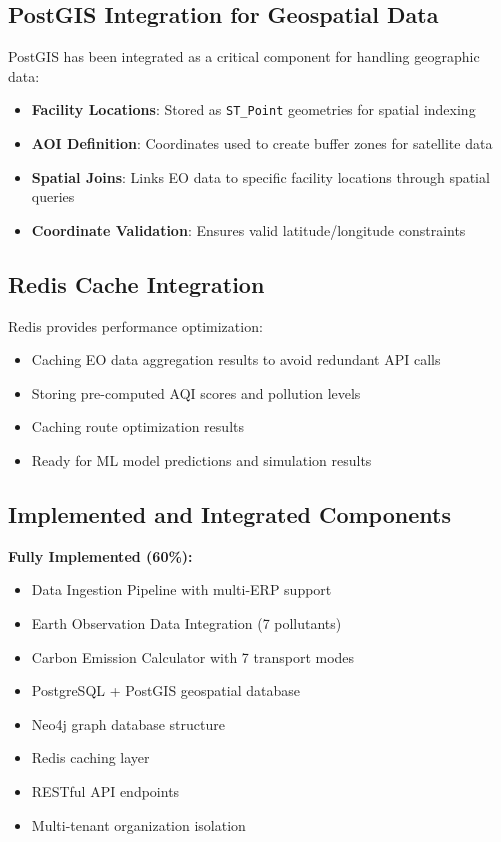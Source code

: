 \documentclass[11pt,a4paper]{article}
\begin{document}
\subsection{PostGIS Integration for Geospatial Data}

PostGIS has been integrated as a critical component for handling geographic data:
\begin{itemize}
    \item \textbf{Facility Locations}: Stored as \texttt{ST\_Point} geometries for spatial indexing
    \item \textbf{AOI Definition}: Coordinates used to create buffer zones for satellite data
    \item \textbf{Spatial Joins}: Links EO data to specific facility locations through spatial queries
    \item \textbf{Coordinate Validation}: Ensures valid latitude/longitude constraints
\end{itemize}

\subsection{Redis Cache Integration}

Redis provides performance optimization:
\begin{itemize}
    \item Caching EO data aggregation results to avoid redundant API calls
    \item Storing pre-computed AQI scores and pollution levels
    \item Caching route optimization results
    \item Ready for ML model predictions and simulation results
\end{itemize}

\subsection{Implemented and Integrated Components}

\textbf{Fully Implemented (60\%):}
\begin{itemize}
    \item Data Ingestion Pipeline with multi-ERP support
    \item Earth Observation Data Integration (7 pollutants)
    \item Carbon Emission Calculator with 7 transport modes
    \item PostgreSQL + PostGIS geospatial database
    \item Neo4j graph database structure
    \item Redis caching layer
    \item RESTful API endpoints
    \item Multi-tenant organization isolation
\end{itemize}
\end{document}
